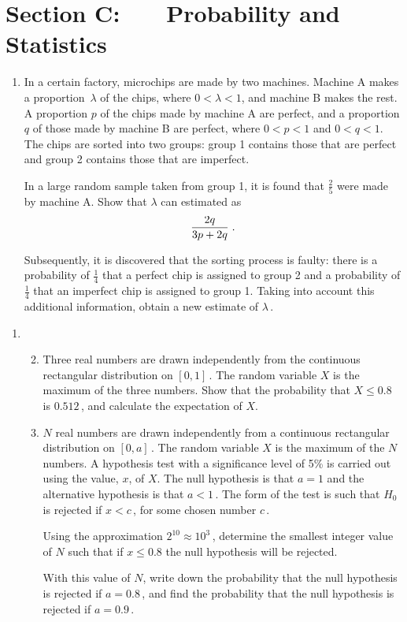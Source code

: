 \documentclass[a4, 11pt]{report}
\newlength{\qspace}
\newcounter{qnumber}
\newenvironment{question}%
 {\vspace{\qspace}
  \begin{enumerate}[\bfseries 1\quad][10]%
    \setcounter{enumi}{\value{qnumber}}%
    \item%
 }
{
  \end{enumerate}
  \filbreak
  \stepcounter{qnumber}
 }
\newenvironment{questionparts}[1][1]%
 {
  \begin{enumerate}[\bfseries (i)]%
    \setcounter{enumii}{#1}
    \addtocounter{enumii}{-1}
    \setlength{\itemsep}{5mm}
    \setlength{\parskip}{8pt}
 }
 {
  \end{enumerate}
 }
\def\le{\leqslant}
\begin{document}
	
	\newpage
\section*{Section C: \ \ \ Probability and Statistics}


\begin{question}
In a certain factory, microchips are made by two machines.
Machine A makes a 
proportion~$\lambda$ of the chips, where $0 < \lambda < 1$, and machine B makes the rest. 
A proportion $p$ of the chips  made by machine A are perfect, and
a  proportion $q$  of those made by machine B are perfect, 
where $0 < p < 1$ and $0 < q < 1$. The chips are sorted into two groups: group 1
contains those that are
perfect and group 2 contains those that are imperfect.

In a large random sample taken from group 1, it is found that
$\frac 2 5$ 
were made by machine A. Show that $\lambda$ can estimated as
\[
 {2q \over 3p + 2q}\;.
\]

Subsequently, it is discovered that the sorting process 
is faulty: there is a probability of $\frac 14$ that a perfect
 chip is assigned to group 2 and a  probability of $\frac 14$ that an imperfect
 chip is assigned to group 1. Taking into account this additional information,
obtain a new  estimate of $\lambda\,$.
\end{question}

\begin{question}
\begin{questionparts}
\item Three real numbers are drawn independently from the continuous 
rectangular distribution on $[ 0, 1 ]\,$. The random variable $X$ is the maximum of the 
three numbers. Show that the probability that $X \le 0.8$ is $0.512\,$, and calculate the
 expectation of $X$. 

\item $N$ real numbers are 
drawn independently from a continuous rectangular distribution on $[ 0, a ]\,$. 
The random variable $X$ is the maximum of the $N$ numbers. 
A hypothesis test  with a significance level of 5\% is carried out using  the value, $x$, of
  $X $. 
The null hypothesis is that $a=1$ and 
the alternative hypothesis is that $a<1 \,$. The form of the test is such that
$H_0$ is rejected 
if $x<c\,$, for some chosen number $c\,$.


Using the approximation 
 $2^{10} \approx 10^3\,$, determine the smallest 
integer value of $N$ such that if $x \le 0.8$ 
the null hypothesis will be rejected.

With this value of $N$,
write down the probability that the null hypothesis is rejected if $a = 0.8\,$, 
and find  the probability that the null hypothesis is rejected if $a = 0.9\,$.


\end{questionparts}
\end{question}
\end{document}
